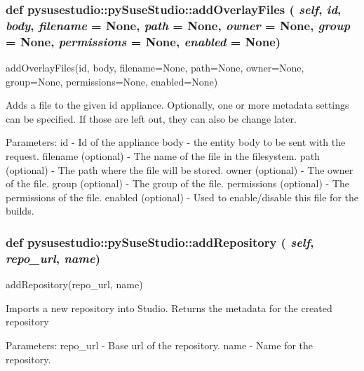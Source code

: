  \hypertarget{classpysusestudio_1_1py_suse_studio_a37506f6f8cd8fc081a8f40bbdacf1de5}{
\subsubsection[{addOverlayFiles}]{\setlength{\rightskip}{0pt plus 5cm}def pysusestudio::pySuseStudio::addOverlayFiles ( {\em self}, \/   {\em id}, \/   {\em body}, \/   {\em filename} = {\ttfamily None}, \/   {\em path} = {\ttfamily None}, \/   {\em owner} = {\ttfamily None}, \/   {\em group} = {\ttfamily None}, \/   {\em permissions} = {\ttfamily None}, \/   {\em enabled} = {\ttfamily None})}}
\label{classpysusestudio_1_1py_suse_studio_a37506f6f8cd8fc081a8f40bbdacf1de5}
\begin{DoxyVerb}addOverlayFiles(id, body, filename=None, path=None, owner=None, group=None, permissions=None, enabled=None)

            Adds a ﬁle to the given id appliance. 
            Optionally, one or more metadata settings can be speciﬁed. If those are left out, they 
            can also be change later. 
            
            Parameters:
id - Id of the appliance
body - the entity body to be sent with the request.
filename (optional) - The name of the file in the filesystem. 
path (optional) - The path where the file will be stored. 
owner (optional) - The owner of the file. 
group (optional) - The group of the file. 
permissions (optional) - The permissions of the file. 
enabled (optional) - Used to enable/disable this file for the builds. 

\end{DoxyVerb}
 \hypertarget{classpysusestudio_1_1py_suse_studio_a19fd7008b36708fad6cbb4a06df68bdb}{
\subsubsection[{addRepository}]{\setlength{\rightskip}{0pt plus 5cm}def pysusestudio::pySuseStudio::addRepository ( {\em self}, \/   {\em repo\_\-url}, \/   {\em name})}}
\label{classpysusestudio_1_1py_suse_studio_a19fd7008b36708fad6cbb4a06df68bdb}
\begin{DoxyVerb}addRepository(repo_url, name)

            Imports a new repository into Studio. Returns the metadata for the created repository
            
            Parameters:
repo_url - Base url of the repository. 
name - Name for the repository. 

\end{DoxyVerb}
